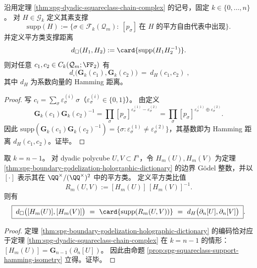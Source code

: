 \begin{proposition}\label{prop:spg-squareclass-support-hamming-isometry}
沿用定理 \ref{thm:spg-dyadic-squareclass-chain-complex} 的记号，固定 \(k\in\{0,\dots,n\}\)。
对 \(H\in\mathcal G_k\) 定义其素支撑
\[
\mathrm{supp}(H):=\{\sigma\in\mathcal F_k(\mathcal Q_m):\ [p_\sigma]\ \text{在 }H\text{ 的平方自由代表中出现}\}.
\]
并定义平方类支撑距离
\[
d_{\square}(H_1,H_2):=\card{\mathrm{supp}(H_1H_2^{-1})}.
\]
则对任意 \(c_1,c_2\in C_k(\mathcal Q_m;\FF_2)\) 有
\[
\boxed{\;
d_{\square}\bigl(\mathbf G_k(c_1),\mathbf G_k(c_2)\bigr)
\ =\
d_H(c_1,c_2)\;},
\]
其中 \(d_H\) 为系数向量的 Hamming 距离。
\end{proposition}
\begin{proof}
写 \(c_i=\sum_{\sigma}\varepsilon^{(i)}_\sigma\,\sigma\)（\(\varepsilon^{(i)}_\sigma\in\{0,1\}\)）。
由定义
\[
\mathbf G_k(c_1)\mathbf G_k(c_2)^{-1}
=\prod_{\sigma}[p_\sigma]^{\varepsilon^{(1)}_\sigma-\varepsilon^{(2)}_\sigma}
=\prod_{\sigma}[p_\sigma]^{\varepsilon^{(1)}_\sigma\oplus\varepsilon^{(2)}_\sigma}.
\]
因此 \(\mathrm{supp}(\mathbf G_k(c_1)\mathbf G_k(c_2)^{-1})=\{\sigma:\varepsilon^{(1)}_\sigma\neq \varepsilon^{(2)}_\sigma\}\)，其基数即为 Hamming 距离 \(d_H(c_1,c_2)\)。证毕。
\end{proof}

\begin{corollary}\label{cor:spg-boundary-godel-ratio-squareclass-isometry}
取 \(k=n-1\)。
对 dyadic polycube \(U,V\subset I^n\)，令 \(H_m(U),H_m(V)\) 为定理 \ref{thm:spg-boundary-godelization-holographic-dictionary} 的边界 Gödel 整数，并以 \([\cdot]\) 表示其在 \(\QQ^\times/(\QQ^\times)^2\) 中的平方类。
定义平方类比值
\[
R_m(U,V):=[H_m(U)]\,[H_m(V)]^{-1}.
\]
则有
\[
\boxed{\;
d_{\square}\bigl([H_m(U)],[H_m(V)]\bigr)
\ =\
\card{\mathrm{supp}(R_m(U,V))}
\ =\
d_H\bigl(\partial_n[U],\partial_n[V]\bigr)\; }.
\]
\end{corollary}
\begin{proof}
定理 \ref{thm:spg-boundary-godelization-holographic-dictionary} 的编码恰对应于定理 \ref{thm:spg-dyadic-squareclass-chain-complex} 在 \(k=n-1\) 的情形：\([H_m(U)]=\mathbf G_{n-1}(\partial_n[U])\)。
因此由命题 \ref{prop:spg-squareclass-support-hamming-isometry} 立得。证毕。
\end{proof}

